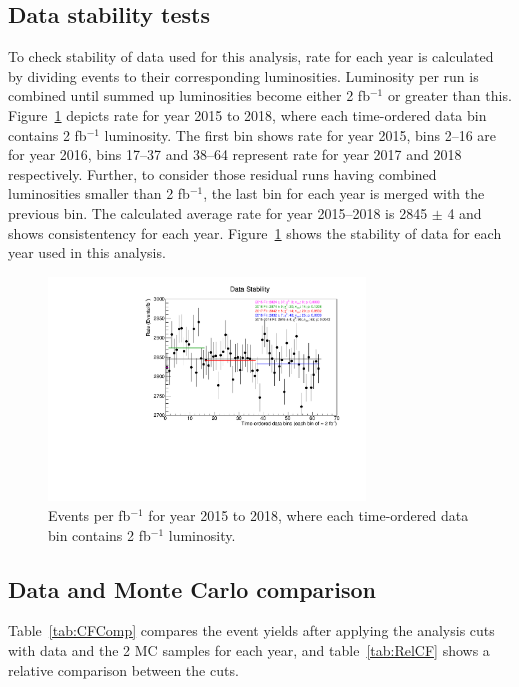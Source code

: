 \subsection{Data stability tests}
To check stability of data used for this analysis, rate for each year is calculated by dividing events to their corresponding luminosities. Luminosity per run is combined until summed up luminosities become either 2 fb$^{-1}$ or greater than this. Figure~\ref{fig:DataStability} depicts rate for year 2015 to 2018, where each time-ordered data bin contains 2 fb$^{-1}$ luminosity. The first bin shows rate for year 2015, bins 2--16 are for year 2016, bins 17--37 and 38--64 represent rate for year 2017 and 2018 respectively. Further, to consider those residual runs having combined luminosities smaller than 2 fb$^{-1}$, the last bin for each year is merged with the previous bin. The calculated average rate for year 2015--2018 is 2845 $\pm$ 4 and shows consistentency for each year. Figure~\ref{fig:DataStability} shows the stability of data for each year used in this analysis.
\begin{figure}[h!]
\centering
\includegraphics[width=0.75\textwidth]{figures/DataStability.pdf}
\caption{Events per fb$^{-1}$ for year 2015 to 2018, where each time-ordered data bin contains 2 fb$^{-1}$ luminosity.}
\label{fig:DataStability}
\end{figure}

\subsection{Data and Monte Carlo comparison}

Table~\ref{tab:CFComp} compares the event yields after applying the analysis cuts with data and the 2 MC samples for each year, and table~\ref{tab:RelCF} shows a relative comparison between the cuts.

